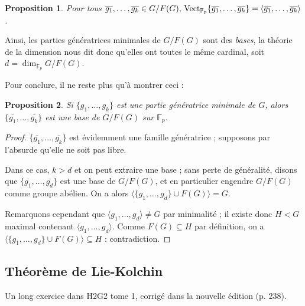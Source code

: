 \documentclass[a4paper, 11pt]{article}
\def\F{\mathbb{F}}
\def\Vect{\textnormal{Vect}}
\newtheorem*{proposition}{Proposition}
\begin{document}
\begin{proposition}
  Pour tous $\overline{g_1}, \ldots, \overline{g_k} \in G/F(G),\,
  \Vect_{\F_p}  \{\overline{g_1}, \ldots, \overline{g_k}\} =
  \langle \overline{g_1}, \ldots, \overline{g_k} \rangle$.
\end{proposition}

Ainsi, les parties génératrices minimales de $G/F(G)$ sont des \emph{bases}, la
théorie de la dimension nous dit donc qu'elles ont toutes le même cardinal, soit
$d = \dim_{\F_p} G/F(G)$.

Pour conclure, il ne reste plus qu'à montrer ceci :

\begin{proposition}
  Si $\{g_1, \ldots, g_k\}$ est une partie génératrice minimale de $G$, alors
  $\{ \overline{g_1}, \ldots, \overline{g_k} \}$ est une base de $G/F(G)$ sur
  $\F_p$.
\end{proposition}
\begin{proof}
  $\{ \overline{g_1}, \ldots, \overline{g_k} \}$ est évidemment une famille
  génératrice ; supposons par l'absurde qu'elle ne soit pas libre.

  Dans ce cas, $k > d$ et on peut extraire une base ; sans perte de généralité,
  disons que $\{ \overline{g_1}, \ldots, \overline{g_d} \}$ est une base de
  $G/F(G)$, et en particulier engendre $G/F(G)$ comme groupe abélien. On a alors
  $\langle \{g_1, \ldots, g_d\} \cup F(G) \rangle = G$.

  Remarquons cependant que $\langle g_1, \ldots, g_d \rangle \neq G$ par
  minimalité ; il existe donc $H < G$ maximal contenant $\langle g_1, \ldots,
  g_d \rangle$. Comme $F(G) \subseteq H$ par définition, on a $\langle \{g_1,
  \ldots, g_d\} \cup F(G) \rangle \subseteq H$ : contradiction.
\end{proof}

\newpage

\subsection{Théorème de Lie-Kolchin}

Un long exercice dans H2G2 tome 1, corrigé dans la nouvelle édition (p. 238).
\end{document}
